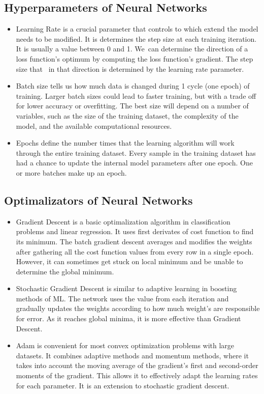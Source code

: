 \subsection*{Hyperparameters of Neural Networks}
\begin{itemize}
	\item Learning Rate is a crucial parameter that controls to which extend the model needs to be modified. It is determines the step size at each training iteration. It is usually a value between 0 and 1. We can determine the direction of a loss function's optimum by computing the loss function's gradient. The step size that  in that direction is determined by the learning rate parameter.
	\item Batch size tells us how much data is changed during 1 cycle (one epoch) of training. Larger batch sizes could lead to faster training, but with a trade off for lower accuracy or overfitting. The best size will depend on a number of variables, such as the size of the training dataset, the complexity of the model, and the available computational resources.
	\item Epochs define the number times that the learning algorithm will work through the entire training dataset. Every sample in the training dataset has had a chance to update the internal model parameters after one epoch. One or more batches make up an epoch.
\end{itemize}



\subsection*{Optimalizators of Neural Networks}
\begin{itemize}
	\item Gradient Descent is a basic optimalization algorithm in classification problems and linear regression. It uses first derivates of cost function to find its minimum. The batch gradient descent averages and modifies the weights after gathering all the cost function values from every row in a single epoch. However, it can sometimes get stuck on local minimum and be unable to determine the global minimum.
	\item Stochastic Gradient Descent is similar to adaptive learning in boosting methods of ML. The network uses the value from each iteration and gradually updates the weights according to how much weight's are responsible for error. As it reaches global minima, it is more effective than Gradient Descent.
	\item Adam is convenient for most convex optimization problems with large datasets. It combines adaptive methods and momentum methods, where it takes into account the moving average of the gradient's first and second-order moments of the gradient. This allows it to effectively adapt the learning rates for each parameter.
	 It is an extension to stochastic gradient descent.
\end{itemize}



